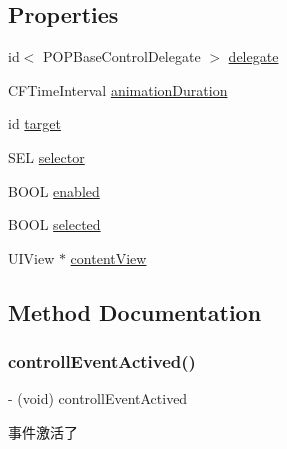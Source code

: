 \subsection*{Properties}
\begin{DoxyCompactItemize}
\item 
id$<$ P\+O\+P\+Base\+Control\+Delegate $>$ \mbox{\hyperlink{interface_p_o_p_base_control_a09c6e575d74b89f2d14dd218ca1af183}{delegate}}
\item 
C\+F\+Time\+Interval \mbox{\hyperlink{interface_p_o_p_base_control_aee9d1d4e75a50d9298601871373136cf}{animation\+Duration}}
\item 
id \mbox{\hyperlink{interface_p_o_p_base_control_a5f6b7b05c669723d12f2729cda155937}{target}}
\item 
S\+EL \mbox{\hyperlink{interface_p_o_p_base_control_a6f75c1c6b50de97c64ac4469bbfe7843}{selector}}
\item 
B\+O\+OL \mbox{\hyperlink{interface_p_o_p_base_control_a35025732593edf44425d3e7e433221b2}{enabled}}
\item 
B\+O\+OL \mbox{\hyperlink{interface_p_o_p_base_control_ac8547b921941dd710d412819f133a754}{selected}}
\item 
U\+I\+View $\ast$ \mbox{\hyperlink{interface_p_o_p_base_control_a9435811830054abb95e90d21766003f7}{content\+View}}
\end{DoxyCompactItemize}


\subsection{Method Documentation}
\mbox{\label{interface_p_o_p_base_control_a96e39b203098160b78db82035ae4208f}} 
\subsubsection{\texorpdfstring{controll\+Event\+Actived()}{controllEventActived()}}
{\footnotesize\ttfamily -\/ (void) controll\+Event\+Actived \begin{DoxyParamCaption}{ }\end{DoxyParamCaption}}

事件激活了 \mbox{\label{interface_p_o_p_base_control_a8e8d12b9f61d08e2d1441480cd4e450e}} 
